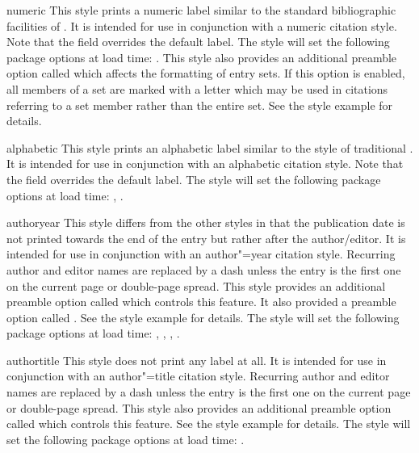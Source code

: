 \begin{marglist}

\item[numeric]
This style prints a numeric label similar to the standard bibliographic facilities of \latex. It is intended for use in conjunction with a numeric citation style. Note that the  field overrides the default label. The style will set the following package options at load time: . This style also provides an additional preamble option called  which affects the formatting of entry sets. If this option is enabled, all members of a set are marked with a letter which may be used in citations referring to a set member rather than the entire set. See the style example for details.

\item[alphabetic]
This style prints an alphabetic label similar to the  style of traditional \bibtex. It is intended for use in conjunction with an alphabetic citation style. Note that the  field overrides the default label. The style will set the following package options at load time: , .

\item[authoryear]
This style differs from the other styles in that the publication date is not printed towards the end of the entry but rather after the author\slash editor. It is intended for use in conjunction with an author"=year citation style. Recurring author and editor names are replaced by a dash unless the entry is the first one on the current page or double-page spread. This style provides an additional preamble option called  which controls this feature. It also provided a preamble option called . See the style example for details. The style will set the following package options at load time: , , , .

\item[authortitle]
This style does not print any label at all. It is intended for use in conjunction with an author"=title citation style. Recurring author and editor names are replaced by a dash unless the entry is the first one on the current page or double-page spread. This style also provides an additional preamble option called  which controls this feature. See the style example for details. The style will set the following package options at load time: .


\end{marglist}
